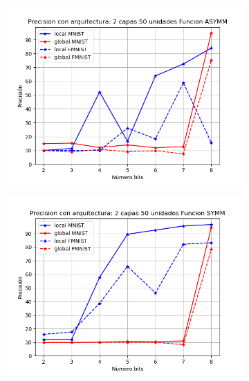 \begin{figure}[H]
    \centering
    \begin{subfigure}[H]{0.475\textwidth}
    \includegraphics[width=\textwidth]{imagenes/backprop/Precision con arquitectura: 2 capas 50 unidades Funcion ASYMM.png}
    \end{subfigure}
    \begin{subfigure}[H]{0.475\textwidth}
    \includegraphics[width=\textwidth]{imagenes/backprop/Precision con arquitectura: 2 capas 50 unidades Funcion SYMM.png}
    \end{subfigure}
    \begin{subfigure}[H]{0.475\textwidth}

\end{subfigure}
\end{figure}
